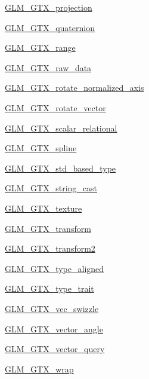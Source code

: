 \begin{DoxyCompactItemize}
\mbox{\hyperlink{group__gtx__projection}{G\+L\+M\+\_\+\+G\+T\+X\+\_\+projection}}
\item 
\mbox{\hyperlink{group__gtx__quaternion}{G\+L\+M\+\_\+\+G\+T\+X\+\_\+quaternion}}
\item 
\mbox{\hyperlink{group__gtx__range}{G\+L\+M\+\_\+\+G\+T\+X\+\_\+range}}
\item 
\mbox{\hyperlink{group__gtx__raw__data}{G\+L\+M\+\_\+\+G\+T\+X\+\_\+raw\+\_\+data}}
\item 
\mbox{\hyperlink{group__gtx__rotate__normalized__axis}{G\+L\+M\+\_\+\+G\+T\+X\+\_\+rotate\+\_\+normalized\+\_\+axis}}
\item 
\mbox{\hyperlink{group__gtx__rotate__vector}{G\+L\+M\+\_\+\+G\+T\+X\+\_\+rotate\+\_\+vector}}
\item 
\mbox{\hyperlink{group__gtx__scalar__relational}{G\+L\+M\+\_\+\+G\+T\+X\+\_\+scalar\+\_\+relational}}
\item 
\mbox{\hyperlink{group__gtx__spline}{G\+L\+M\+\_\+\+G\+T\+X\+\_\+spline}}
\item 
\mbox{\hyperlink{group__gtx__std__based__type}{G\+L\+M\+\_\+\+G\+T\+X\+\_\+std\+\_\+based\+\_\+type}}
\item 
\mbox{\hyperlink{group__gtx__string__cast}{G\+L\+M\+\_\+\+G\+T\+X\+\_\+string\+\_\+cast}}
\item 
\mbox{\hyperlink{group__gtx__texture}{G\+L\+M\+\_\+\+G\+T\+X\+\_\+texture}}
\item 
\mbox{\hyperlink{group__gtx__transform}{G\+L\+M\+\_\+\+G\+T\+X\+\_\+transform}}
\item 
\mbox{\hyperlink{group__gtx__transform2}{G\+L\+M\+\_\+\+G\+T\+X\+\_\+transform2}}
\item 
\mbox{\hyperlink{group__gtx__type__aligned}{G\+L\+M\+\_\+\+G\+T\+X\+\_\+type\+\_\+aligned}}
\item 
\mbox{\hyperlink{group__gtx__type__trait}{G\+L\+M\+\_\+\+G\+T\+X\+\_\+type\+\_\+trait}}
\item 
\mbox{\hyperlink{group__gtx__vec__swizzle}{G\+L\+M\+\_\+\+G\+T\+X\+\_\+vec\+\_\+swizzle}}
\item 
\mbox{\hyperlink{group__gtx__vector__angle}{G\+L\+M\+\_\+\+G\+T\+X\+\_\+vector\+\_\+angle}}
\item 
\mbox{\hyperlink{group__gtx__vector__query}{G\+L\+M\+\_\+\+G\+T\+X\+\_\+vector\+\_\+query}}
\item 
\mbox{\hyperlink{group__gtx__wrap}{G\+L\+M\+\_\+\+G\+T\+X\+\_\+wrap}}
\end{DoxyCompactItemize}


